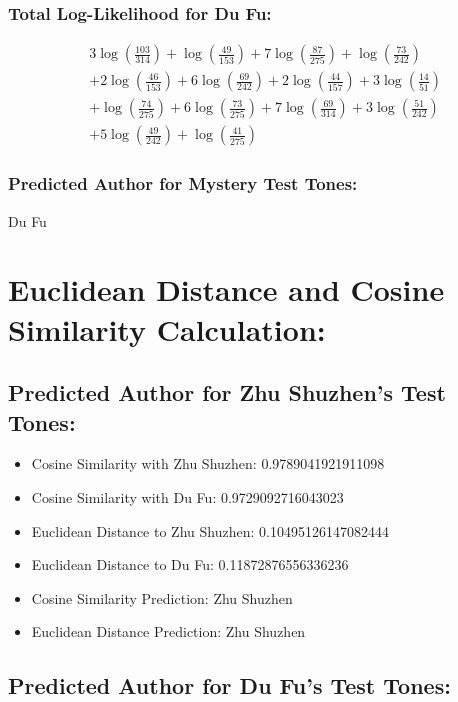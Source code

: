 \documentclass[12pt]{article}
\begin{document}
\subsubsection*{Total Log-Likelihood for Du Fu:}

\[
\begin{aligned}
    &3 \log\left(\frac{103}{314}\right) + \log\left(\frac{49}{153}\right) + 7 \log\left(\frac{87}{275}\right) + \log\left(\frac{73}{242}\right) \\
    &+ 2 \log\left(\frac{46}{153}\right) + 6 \log\left(\frac{69}{242}\right) + 2 \log\left(\frac{44}{157}\right) + 3 \log\left(\frac{14}{51}\right) \\
    &+ \log\left(\frac{74}{275}\right) + 6 \log\left(\frac{73}{275}\right) + 7 \log\left(\frac{69}{314}\right) + 3 \log\left(\frac{51}{242}\right) \\
    &+ 5 \log\left(\frac{49}{242}\right) + \log\left(\frac{41}{275}\right)
\end{aligned}
\]

\subsubsection*{Predicted Author for Mystery Test Tones: }
Du Fu

\section*{Euclidean Distance and Cosine Similarity Calculation: }


\subsection*{Predicted Author for Zhu Shuzhen's Test Tones:}

\begin{itemize}
    \item Cosine Similarity with Zhu Shuzhen: 0.9789041921911098
    \item Cosine Similarity with Du Fu: 0.9729092716043023
    \item Euclidean Distance to Zhu Shuzhen: 0.10495126147082444
    \item Euclidean Distance to Du Fu: 0.11872876556336236
    \item Cosine Similarity Prediction: Zhu Shuzhen
    \item Euclidean Distance Prediction: Zhu Shuzhen
\end{itemize}

\subsection*{Predicted Author for Du Fu's Test Tones:}
\end{document}
